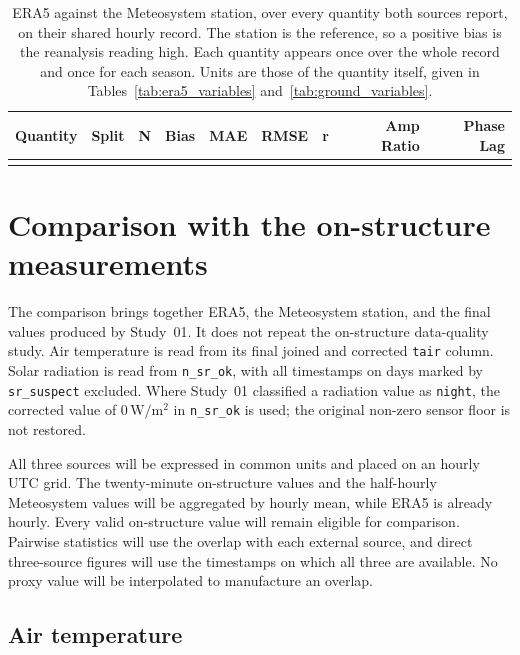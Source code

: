 \documentclass[11pt,a4paper]{article}
\begin{document}
\begin{table}[H]
\centering
\small
\begin{tabular}{llrrrrrrr}
\toprule
\textbf{Quantity} & \textbf{Split} & \textbf{N} & \textbf{Bias} & \textbf{MAE} &
\textbf{RMSE} & \textbf{r} & \textbf{Amp Ratio} & \textbf{Phase Lag} \\
\midrule
\\
\bottomrule
\end{tabular}
\caption{ERA5 against the Meteosystem station, over every quantity both sources
report, on their shared hourly record. The station is the reference, so a
positive bias is the reanalysis reading high. Each quantity appears once over the
whole record and once for each season. Units are those of the quantity itself,
given in Tables~\ref{tab:era5_variables} and~\ref{tab:ground_variables}.}
\label{tab:cross_source}
\end{table}

\section{Comparison with the on-structure measurements}
\label{sec:comparison}

The comparison brings together ERA5, the Meteosystem station, and the final
values produced by Study~01. It does not repeat the on-structure data-quality
study. Air temperature is read from its final joined and corrected
\texttt{tair} column. Solar radiation is read from \texttt{n\_sr\_ok}, with all
timestamps on days marked by \texttt{sr\_suspect} excluded. Where Study~01
classified a radiation value as \texttt{night}, the corrected value of
$0\,\mathrm{W/m^2}$ in \texttt{n\_sr\_ok} is used; the original non-zero sensor
floor is not restored.

All three sources will be expressed in common units and placed on an hourly UTC
grid. The twenty-minute on-structure values and the half-hourly Meteosystem
values will be aggregated by hourly mean, while ERA5 is already hourly. Every
valid on-structure value will remain eligible for comparison. Pairwise
statistics will use the overlap with each external source, and direct
three-source figures will use the timestamps on which all three are available.
No proxy value will be interpolated to manufacture an overlap.

\subsection{Air temperature}
\end{document}
